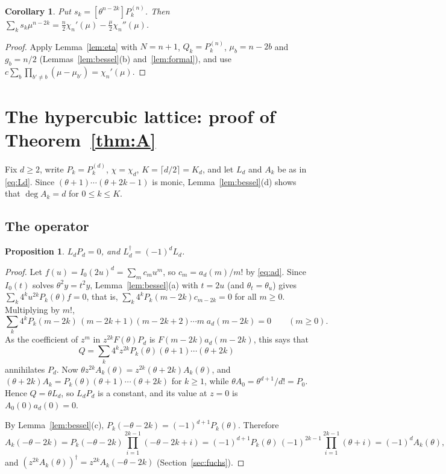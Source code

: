 \documentclass[11pt]{amsart}
\newtheorem{proposition}[thm]{Proposition}
\newtheorem{corollary}[thm]{Corollary}
\theoremstyle{definition}
\begin{document}
\begin{corollary}\label{cor:sub}
Put $s_k=[\theta^{n-2k}]P^{(n)}_k$. Then $\sum_ks_k\mu^{n-2k}=\frac n2\chi_n'(\mu)-\frac\mu2\chi_n''(\mu)$.
\end{corollary}

\begin{proof}
Apply Lemma~\ref{lem:eta} with $N=n+1$, $Q_k=P^{(n)}_k$, $\mu_b=n-2b$ and $g_b=n/2$ (Lemmas~\ref{lem:bessel}(b) and~\ref{lem:formal}), and use $c\sum_b\prod_{b'\ne b}(\mu-\mu_{b'})=\chi_n'(\mu)$.
\end{proof}
\section{The hypercubic lattice: proof of \texorpdfstring{Theorem~\ref{thm:A}}{Theorem A}}\label{sec:A}

Fix $d\ge2$, write $P_k=P^{(d)}_k$, $\chi=\chi_d$, $K=\lceil d/2\rceil=K_d$, and let $L_d$ and $A_k$ be as in \eqref{eq:Ld}. Since $(\theta+1)\cdots(\theta+2k-1)$ is monic, Lemma~\ref{lem:bessel}(d) shows that $\deg A_k=d$ for $0\le k\le K$.

\subsection{The operator}

\begin{proposition}\label{prop:Ld}
$L_dP_d=0$, and $L_d^\dagger=(-1)^dL_d$.
\end{proposition}

\begin{proof}
Let $f(u)=I_0(2u)^d=\sum_mc_mu^m$, so $c_m=a_d(m)/m!$ by \eqref{eq:ad}. Since $I_0(t)$ solves $\theta^2y=t^2y$, Lemma~\ref{lem:bessel}(a) with $t=2u$ (and $\theta_t=\theta_u$) gives $\sum_k4^ku^{2k}P_k(\theta)f=0$, that is, $\sum_k4^kP_k(m-2k)c_{m-2k}=0$ for all $m\ge0$. Multiplying by $m!$,
\[
\sum_k4^kP_k(m-2k)\,(m-2k+1)(m-2k+2)\cdots m\;a_d(m-2k)=0\qquad(m\ge0).
\]
As the coefficient of $z^m$ in $z^{2k}F(\theta)P_d$ is $F(m-2k)a_d(m-2k)$, this says that
\[
Q=\sum_k4^kz^{2k}P_k(\theta)(\theta+1)\cdots(\theta+2k)
\]
annihilates $P_d$. Now $\theta z^{2k}A_k(\theta)=z^{2k}(\theta+2k)A_k(\theta)$, and $(\theta+2k)A_k=P_k(\theta)(\theta+1)\cdots(\theta+2k)$ for $k\ge1$, while $\theta A_0=\theta^{d+1}/d!=P_0$. Hence $Q=\theta L_d$, so $L_dP_d$ is a constant, and its value at $z=0$ is $A_0(0)a_d(0)=0$.

By Lemma~\ref{lem:bessel}(c), $P_k(-\theta-2k)=(-1)^{d+1}P_k(\theta)$. Therefore
\[
A_k(-\theta-2k)=P_k(-\theta-2k)\prod_{i=1}^{2k-1}(-\theta-2k+i)=(-1)^{d+1}P_k(\theta)\,(-1)^{2k-1}\prod_{i=1}^{2k-1}(\theta+i)=(-1)^dA_k(\theta),
\]
and $(z^{2k}A_k(\theta))^\dagger=z^{2k}A_k(-\theta-2k)$ (Section~\ref{sec:fuchs}).
\end{proof}
\end{document}

